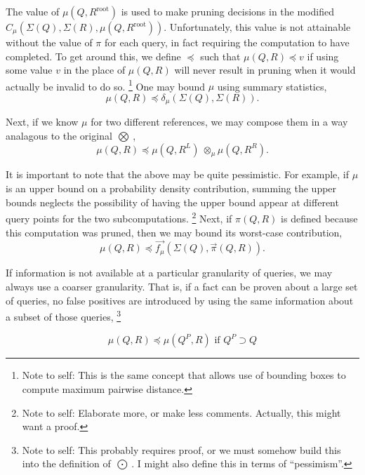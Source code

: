 \documentclass[times, 10pt,twocolumn]{article}
\newcommand{\authornote}[1]{\footnote{Note to self: #1}}
\newcommand{\kdroot}[1]{#1^{\text{root}}}
\newcommand{\kdleft}[1]{#1^{\!L}}
\newcommand{\kdright}[1]{#1^{\!R}}
\newcommand{\kdparent}[1]{#1^{\!P}}
\newcommand{\myOp}[1]{\mathop{\bigotimes\nolimits\!\!_{#1}}}
\newcommand{\myop}[1]{{\scriptstyle\:}\otimes_{\!#1}}
\newcommand{\myOutop}[1]{\mathop{\bigodot\nolimits\!\!_{#1}}}
\newcommand{\letterqr}{\pi}
\newcommand{\inqr}{\pi}
\newcommand{\Opqr}{\myOp{\letterqr}}
\newcommand{\inqrv}{\vec{\pi}}
\newcommand{\lettermu}{\mu}
\newcommand{\inmu}{\mu}
\newcommand{\Outopmu}{\myOutop{\mu}}
\newcommand{\opmu}{\myop{\mu}}
\newcommand{\fmuv}{\vec{f_{\mu}}}
\newcommand{\deltamu}{\delta_{\mu}}
\newcommand{\canprunemu}{C_{\mu}}
\newcommand{\allowmu}{\preceq}
\newcommand{\outstat}{\Sigma}
\begin{document}
The value of $\inmu(Q, \kdroot{R})$ is used to make pruning decisions in the modified $\canprunemu(\outstat(Q), \outstat(R), \inmu(Q, \kdroot{R}))$.
Unfortunately, this value is not attainable without the value of $\inqr$ for each query, in fact requiring the computation to have completed.
To get around this, we define $\allowmu$ such that $\inmu(Q,R) \allowmu v$ if using some value $v$ in the place of $\inmu(Q, R)$ will never result in pruning when it would actually be invalid to do so.
\authornote{This is the same concept that allows use of bounding boxes to compute maximum pairwise distance.}
One may bound $\inmu$ using summary statistics,
\begin{equation}
\inmu(Q, R) \allowmu \deltamu(\outstat(Q), \outstat(R)).
\label{eqn:approxmu}
\end{equation}

\noindent Next, if we know $\inmu$ for two different references, we may compose them in a way analagous to the original $\Opqr$,
\begin{equation}
\inmu(Q, R) \allowmu \inmu(Q, \kdleft{R}) \opmu \inmu(Q, \kdright{R}).
\label{eqn:combinemu}
\end{equation}

\noindent It is important to note that the above may be quite pessimistic.
For example, if $\inmu$ is an upper bound on a probability density contribution, summing the upper bounds neglects the possibility of having the upper bound appear at different query points for the two subcomputations.
\authornote{Elaborate more, or make less comments.  Actually, this might want a proof.}
Next, if $\pi(Q, R)$ is defined because this computation was pruned, then we may bound its worst-case contribution,
\begin{equation}
\inmu(Q, R) \allowmu \fmuv(\outstat(Q), \inqrv(Q, R)).
\label{eqn:pimu}
\end{equation}

\noindent 
If information is not available at a particular granularity of queries, we may always use a coarser granularity.
That is, if a fact can be proven about a large set of queries, no false positives are introduced by using the same information about a subset of those queries,
\authornote{This probably requires proof, or we must somehow build this into the definition of $\Outopmu$.  I might also define this in terms of ``pessimism''.}

\begin{equation}
\inmu(Q, R) \allowmu \inmu(\kdparent{Q}, R) \text{ if } \kdparent{Q} \supset Q
\end{equation}
\end{document}
